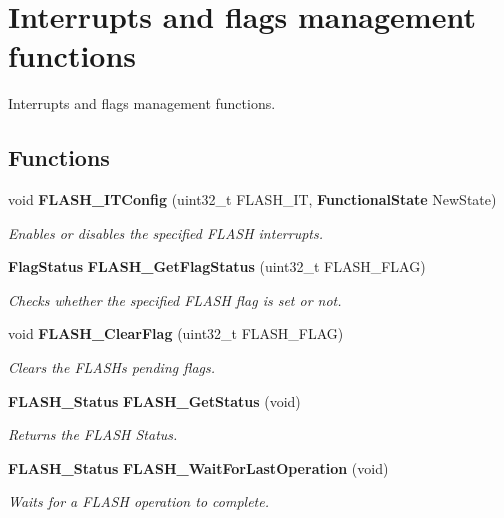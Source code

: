 \section{Interrupts and flags management functions}
\label{group__FLASH__Group4}


Interrupts and flags management functions.  


\subsection*{Functions}
\begin{DoxyCompactItemize}
\item 
void \textbf{ F\+L\+A\+S\+H\+\_\+\+I\+T\+Config} (uint32\+\_\+t F\+L\+A\+S\+H\+\_\+\+IT, \textbf{ Functional\+State} New\+State)
\begin{DoxyCompactList}\small\item\em Enables or disables the specified F\+L\+A\+SH interrupts. \end{DoxyCompactList}\item 
\textbf{ Flag\+Status} \textbf{ F\+L\+A\+S\+H\+\_\+\+Get\+Flag\+Status} (uint32\+\_\+t F\+L\+A\+S\+H\+\_\+\+F\+L\+AG)
\begin{DoxyCompactList}\small\item\em Checks whether the specified F\+L\+A\+SH flag is set or not. \end{DoxyCompactList}\item 
void \textbf{ F\+L\+A\+S\+H\+\_\+\+Clear\+Flag} (uint32\+\_\+t F\+L\+A\+S\+H\+\_\+\+F\+L\+AG)
\begin{DoxyCompactList}\small\item\em Clears the F\+L\+A\+SH\textquotesingle{}s pending flags. \end{DoxyCompactList}\item 
\textbf{ F\+L\+A\+S\+H\+\_\+\+Status} \textbf{ F\+L\+A\+S\+H\+\_\+\+Get\+Status} (void)
\begin{DoxyCompactList}\small\item\em Returns the F\+L\+A\+SH Status. \end{DoxyCompactList}\item 
\textbf{ F\+L\+A\+S\+H\+\_\+\+Status} \textbf{ F\+L\+A\+S\+H\+\_\+\+Wait\+For\+Last\+Operation} (void)
\begin{DoxyCompactList}\small\item\em Waits for a F\+L\+A\+SH operation to complete. \end{DoxyCompactList}\end{DoxyCompactItemize}


